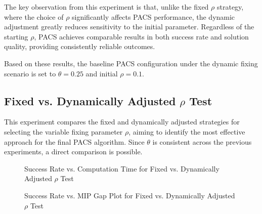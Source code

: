The key observation from this experiment is that, unlike the fixed $\rho$ strategy, where the choice of $\rho$ significantly affects PACS performance, the dynamic adjustment greatly reduces sensitivity to the initial parameter. Regardless of the starting $\rho$, PACS achieves comparable results in both success rate and solution quality, providing consistently reliable outcomes.

Based on these results, the baseline PACS configuration under the dynamic fixing scenario is set to $\theta = 0.25$ and initial $\rho = 0.1$.

\subsection{Fixed vs. Dynamically Adjusted $\rho$ Test}\label{sec:test_fixvsdyn_rho}
This experiment compares the fixed and dynamically adjusted strategies for selecting the variable fixing parameter $\rho$, aiming to identify the most effective approach for the final PACS algorithm. Since $\theta$ is consistent across the previous experiments, a direct comparison is possible.

\begin{figure}[H]
\centering
\begin{minipage}{0.6\columnwidth}
\centering
\resizebox{\linewidth}{!}{}
\end{minipage}%
\hfill
\begin{minipage}{0.4\columnwidth}
\centering
\resizebox{\linewidth}{!}{}
\end{minipage}
\caption{Success Rate vs. Computation Time for Fixed vs. Dynamically Adjusted $\rho$ Test}
\label{fig:PACS_STD_DYN_SuccRate}
\end{figure}

\begin{figure}[H]
\centering
\begin{minipage}{0.6\columnwidth}
\centering
\resizebox{\linewidth}{!}{}
\end{minipage}%
\hfill
\begin{minipage}{0.4\columnwidth}
\centering
\resizebox{\linewidth}{!}{}
\end{minipage}
\caption{Success Rate vs. MIP Gap Plot for Fixed vs. Dynamically Adjusted $\rho$ Test}
\label{fig:PACS_STD_DYN_MGAP}
\end{figure}

